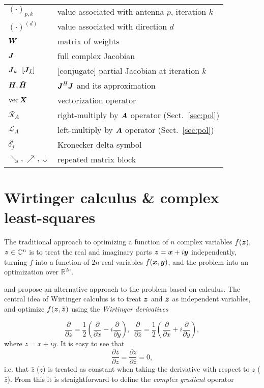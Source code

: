 \documentclass[useAMS,usenatbib]{mn2e}
\newcommand{\COMPLEX}{\mathbb{C}}
\newcommand{\REAL}{\mathbb{R}}
\newcommand{\zz}{\bmath{z}}
\newcommand{\mat}[1]{{\bmath{#1}}}
\newcommand{\JJ}{\mat{J}} %
\newcommand{\JHJ}{\JJ^H\JJ} %
\newcommand{\Rop}[1]{\mathcal{R}_{{#1}}}
\newcommand{\Lop}[1]{\mathcal{L}_{{#1}}}
\begin{document}
\begin{table}
\begin{tabular}{ll}
$(\cdot)_{p,k}$ & value associated with antenna $p$, iteration $k$ \\
$(\cdot)^{(d)}$ & value associated with direction $d$\\
$\bmath{W}$ & matrix of weights \\
$\JJ$ & full complex Jacobian \\
$\JJ_k~~[\JJ_{\bar k}]$ & [conjugate] partial Jacobian at iteration $k$\\
$\bmath{H}, \bmath{\tilde{H}}$ & $\JHJ$ and its approximation \\
$\mathrm{vec}\,\bmath{X}$ & vectorization operator \\
$\Rop{A}$ & right-multiply by $\bmath{A}$ operator (Sect.~\ref{sec:pol}) \\
$\Lop{A}$ & left-multiply by $\bmath{A}$ operator (Sect.~\ref{sec:pol}) \\
$\delta^i_j$ & Kronecker delta symbol \\
$\searrow,\nearrow,\downarrow$ & repeated matrix block \\
\hline



\end{tabular}
\end{table}

\section{Wirtinger calculus \& complex least-squares}
\label{sec:Wirtinger}

The traditional approach to optimizing a function of $n$ complex variables $f(\zz),$ $\zz\in\COMPLEX^n$ is
to treat the real and imaginary parts $\zz=\bmath{x}+i\bmath{y}$ independently, turning $f$ into a function
of $2n$ real variables $f(\bmath{x},\bmath{y})$, and the problem into an optimization over $\REAL^{2n}$.

\citet{CR-Calculus} and \citet{ComplexOpt} propose an alternative approach to the problem based on \citet{WirtingerDeriv} calculus. 
The central idea of Wirtinger calculus is to treat $\zz$ and $\bar{\zz}$ as independent variables, and optimize $f(\zz,\bar{\zz})$
using the {\em Wirtinger derivatives} 

\[
\frac{\partial}{\partial z} = \frac{1}{2}\left ( \frac{\partial}{\partial x} - i\frac{\partial}{\partial y} \right),~~
\frac{\partial}{\partial \bar{z}} = \frac{1}{2}\left ( \frac{\partial}{\partial x} + i\frac{\partial}{\partial y} \right),
\]
where $z=x+iy$. It is easy to see that  
\[
\frac{\partial \bar z}{\partial z} = 
\frac{\partial z}{\partial \bar z} = 0,
\]
i.e. that $\bar z$ ($z$) is treated as constant when taking the derivative with respect to $z$ ($\bar z$). From this 
it is straightforward to define the \emph{complex gradient} operator 
\end{document}
